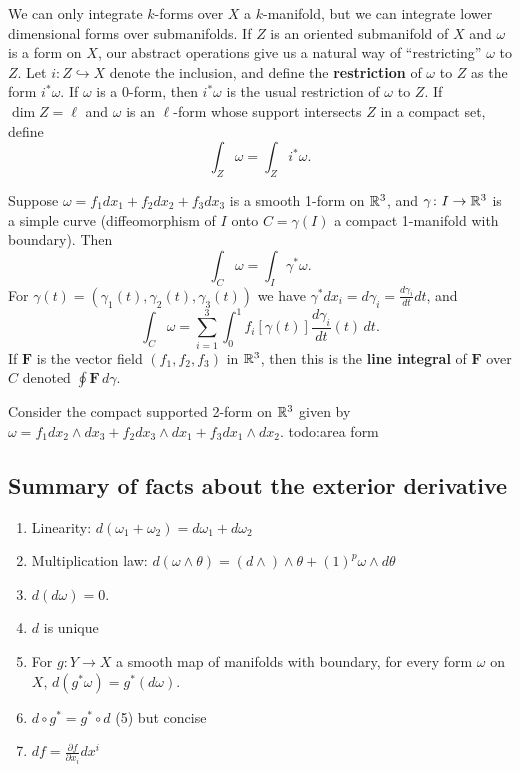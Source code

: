 We can only integrate $k$-forms over $X$ a $k$-manifold, but we can integrate lower dimensional forms over submanifolds. If $Z$ is an oriented submanifold of $X$ and $\omega$ is a form on $X$, our abstract operations give us a natural way of ``restricting'' $\omega$ to $Z$. Let $i\colon Z \hookrightarrow X$ denote the inclusion, and define the \textbf{restriction} of $\omega$ to $Z$ as the form $i^* \omega$. If $\omega$ is a 0-form, then  $i^*\omega$ is the usual restriction of $\omega$ to $Z$. If $\dim Z= \ell$ and $\omega$ is an $\ell$-form whose support intersects $Z$ in a compact set, define \[
\int_Z \omega=\int_Z i^* \omega.
\] 
\begin{example}
    Suppose $\omega=f_1dx_1+f_2dx_2+f_3dx_3$ is a smooth 1-form on $\mathbb{R}^3$, and $\gamma \colon I \to \mathbb{R}^3$ is a simple curve (diffeomorphism of $I$ onto $C=\gamma (I)$ a compact 1-manifold with boundary). Then \[
    \int_C \omega=\int_I \gamma ^* \omega.
\] For $\gamma (t)=(\gamma_1(t),\gamma_2(t),\gamma_3(t))  $ we have $\gamma ^* dx_i =d\gamma _i = \frac{d\gamma _i }{dt}dt$, and \[
\int _C \omega= \sum_{i=1}^{3} \int_{0}^{1} f_i [\gamma (t)] \frac{d\gamma _i }{dt}(t) \, dt.
\] If $\mathbf F$ is the vector field $(f_1,f_2,f_3)$ in $\mathbb{R}^3$, then this is the \textbf{line integral} of $\mathbf F$ over $C$ denoted $\oint \mathbf F\,d \gamma $.
\end{example}
\begin{example}
    Consider the compact supported 2-form on $\mathbb{R}^3$ given by $\omega=f_1 dx_2\wedge dx_3+f_2 dx_3\wedge dx_1+ f_3 dx_1\wedge dx_2$. {\color{red}todo:area form} 
\end{example}

\subsection{Summary of facts about the exterior derivative}
\begin{enumerate}[label=(\arabic*)]
\setlength\itemsep{-.2em}
    \item Linearity: $d(\omega_1+\omega_2)=d\omega_1+d\omega_2$ 
    \item Multiplication law: $d(\omega \wedge \theta)=(d\wedge ) \wedge  \theta+(1)^p \omega \wedge d\theta$
    \item $d(d\omega)=0$.
    \item $d$ is unique
    \item For $g \colon Y \to X$ a smooth map of manifolds with boundary, for every form $\omega$ on $X$, $d(g^* \omega)=g^* (d \omega)$.
    \item $d \circ g^* = g^* \circ d$ (5) but concise
    \item $df= \frac{\partial f}{\partial x_i } dx^i $
\end{enumerate}

